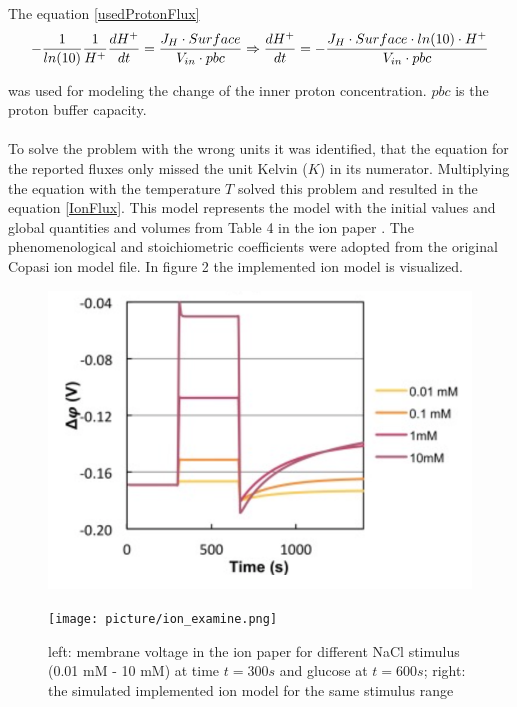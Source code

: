 The equation \ref{usedProtonFlux} 
\begin{equation}\label{usedProtonFlux}
- \frac{1}{ln(10)} \frac{1}{H^+}\frac{dH^+}{dt} = \frac{J_H \cdot Surface}{V_{in} \cdot pbc}\\
\Rightarrow \frac{dH^+}{dt}=-\frac{J_H \cdot Surface \cdot ln(10) \cdot H^+}{V_{in} \cdot pbc}
\end{equation}

was used for modeling the change of the inner proton concentration. $pbc$ is the proton buffer capacity.\\\\
To solve the problem with the wrong units it was identified, that the equation for the reported fluxes only missed the unit Kelvin ($K$) in its numerator. Multiplying the equation with the temperature $T$ solved this problem and resulted in the equation \ref{IonFlux}.
This model represents the model with the initial values and global quantities and volumes from Table 4 in the ion paper \cite{Gerber_2016}. The phenomenological and stoichiometric coefficients were adopted from the original Copasi ion model file. In figure 2 the implemented ion model is visualized.
\begin{figure}[htbp]
	
	\begin{minipage}{0,5\textwidth}
		
		\includegraphics[width=\textwidth]{picture/Ion_Paper.png}
		
		\label{IonPaper} 
	\end{minipage}
	\begin{minipage}{0,5\textwidth}
		
		\texttt{[image: picture/ion\_examine.png]}
		
		\label{IonImplemented} 
	\end{minipage}
	\caption{left: membrane voltage in the ion paper for different NaCl stimulus (0.01 mM - 10 mM) at time $t=300s$ and glucose at $t=600s$; right: the simulated implemented ion model for the same stimulus range }
\end{figure}

